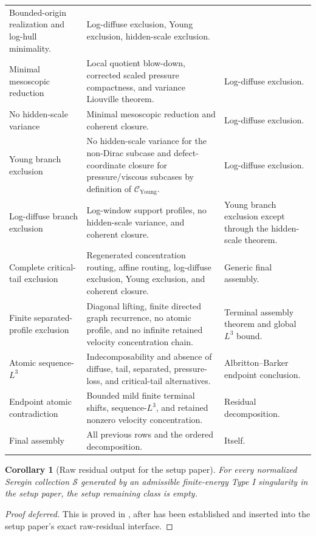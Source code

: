 \documentclass[11pt]{amsart}
\numberwithin{equation}{section}
\theoremstyle{plain}
\newtheorem{corollary}[corollary]{Corollary}
\theoremstyle{definition}
\theoremstyle{remark}
\newcommand{\calS}{\mathcal S}
\newcommand{\Cyoung}{\mathcal C_{\mathrm{Young}}}
\begin{document}
\begin{longtable}{@{}L{0.24\textwidth}L{0.45\textwidth}L{0.23\textwidth}@{}}
Bounded-origin realization and log-hull minimality. &
Log-diffuse exclusion, Young exclusion, hidden-scale exclusion.\\
Minimal mesoscopic reduction &
Local quotient blow-down, corrected scaled pressure compactness, and variance
Liouville theorem. &
Log-diffuse exclusion.\\
No hidden-scale variance &
Minimal mesoscopic reduction and coherent closure. &
Log-diffuse exclusion.\\
Young branch exclusion &
No hidden-scale variance for the non-Dirac subcase and defect-coordinate closure
for pressure/viscous subcases by definition of \(\Cyoung\). &
Log-diffuse exclusion.\\
Log-diffuse branch exclusion &
Log-window support profiles, no hidden-scale variance, and coherent closure. &
Young branch exclusion except through the hidden-scale theorem.\\
Complete critical-tail exclusion &
Regenerated concentration routing, affine routing, log-diffuse exclusion, Young
exclusion, and coherent closure. &
Generic final assembly.\\
Finite separated-profile exclusion &
Diagonal lifting, finite directed graph recurrence, no atomic profile, and no
infinite retained velocity concentration chain. &
Terminal assembly theorem and global \(L^3\) bound.\\
Atomic sequence-\(L^3\) &
Indecomposability and absence of diffuse, tail, separated, pressure-loss, and
critical-tail alternatives. &
Albritton--Barker endpoint conclusion.\\
Endpoint atomic contradiction &
Bounded mild finite terminal shifts, sequence-\(L^3\), and retained nonzero
velocity concentration. &
Residual decomposition.\\
Final assembly &
All previous rows and the ordered decomposition. &
Itself.\\
\hline
\end{longtable}

\begin{corollary}[Raw residual output for the setup paper]
\label{cor:paperI-residual-input}
For every normalized Seregin collection \(\calS\) generated by an
admissible finite-energy Type I singularity in the setup paper, the setup
remaining class is empty.
\end{corollary}

\begin{proof}[Proof deferred]
This is proved in , after
 has been established and inserted into the
setup paper's exact raw-residual interface.
\end{proof}
\end{document}
